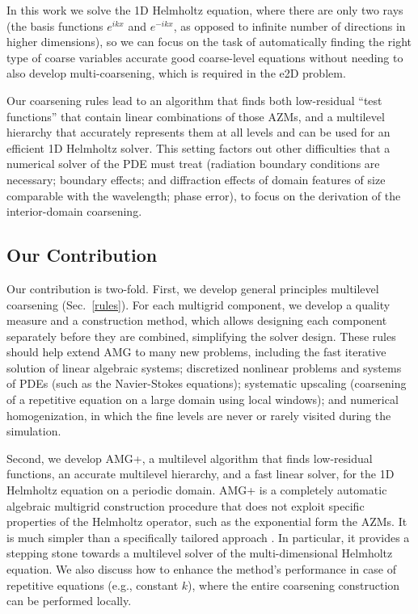 \documentclass{article}
\begin{document}
In this work we solve the 1D Helmholtz equation, where there are only two rays (the basis functions $e^{i k x}$ and $e^{-i k x}$, as opposed to infinite number of directions in higher dimensions), so we can focus on the task of automatically finding the right type of coarse variables accurate good coarse-level equations without needing to also develop multi-coarsening, which is required in the e2D problem.

Our coarsening rules lead to an algorithm that finds both low-residual ``test functions'' that contain linear combinations of those AZMs, and a multilevel hierarchy that accurately represents them at all levels and can be used for an efficient 1D Helmholtz solver. This setting factors out other difficulties that a numerical solver of the PDE must treat (radiation boundary conditions are necessary; boundary effects; and diffraction effects of domain features of size comparable with the wavelength; phase error), to focus on the derivation of the interior-domain coarsening.

\subsection{Our Contribution}
Our contribution is two-fold. First, we develop general principles multilevel coarsening (Sec.~\ref{rules}). For each multigrid component, we develop a quality measure and a construction method, which allows designing each component separately before they are combined, simplifying the solver design. These rules should help extend AMG to many new problems, including the fast iterative solution of linear algebraic systems; discretized nonlinear problems and systems of PDEs (such as the Navier-Stokes equations); systematic upscaling (coarsening of a repetitive equation on a large domain using local windows); and numerical homogenization, in which the fine levels are never or rarely visited during the simulation.

Second, we develop AMG+, a multilevel algorithm that finds low-residual functions, an accurate multilevel hierarchy, and a fast linear solver, for the 1D Helmholtz equation on a periodic domain. AMG+ is a completely automatic algebraic multigrid construction procedure that does not exploit specific properties of the Helmholtz operator, such as the exponential form the AZMs. It is much simpler than a specifically tailored approach  \cite{wave_ray, later_papers}. In particular, it provides a stepping stone towards a multilevel solver of the multi-dimensional Helmholtz equation. We also discuss how to enhance the method's performance in case of repetitive equations (e.g., constant $k$), where the entire coarsening construction can be performed locally.
\end{document}
